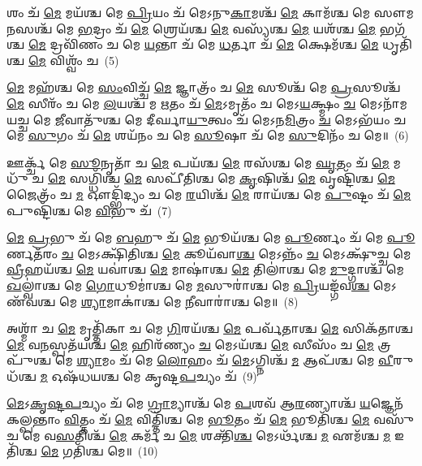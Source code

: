 {\anuvakamend[{𑌜\-\ul{𑌗}\-𑌚𑍍𑌚\-\ul{𑌰𑍍𑌦𑍍𑌧𑌿}\-𑌶𑍍𑌚𑌤𑍁᳴𑌰𑍍𑌦𑌶 𑌚}]}%

𑌶𑌂 𑌚᳴ \ul{𑌮𑍇} 𑌮𑌯᳴𑌶𑍍𑌚 𑌮𑍇 \ul{𑌪𑍍𑌰𑌿}\-𑌯𑌂 𑌚᳴ 𑌮𑍇\-𑌽𑌨𑍁\-\ul{𑌕𑌾}\-𑌮𑌶𑍍𑌚᳴ \ul{𑌮𑍇} 𑌕𑌾𑌮᳴𑌶𑍍𑌚 𑌮𑍇 𑌸𑍗𑌮\-\ul{𑌨}\-𑌸𑌶𑍍𑌚᳴ 𑌮𑍇 \ul{𑌭}\-𑌦𑍍𑌰𑌂 𑌚᳴ \ul{𑌮𑍇} 𑌶𑍍𑌰𑍇𑌯᳴𑌶𑍍𑌚 \ul{𑌮𑍇} 𑌵𑌸𑍍𑌯᳴𑌶𑍍𑌚 \ul{𑌮𑍇} 𑌯𑌶᳴𑌶𑍍𑌚 \ul{𑌮𑍇} 𑌭𑌗᳴𑌶𑍍𑌚 \ul{𑌮𑍇} 𑌦𑍍𑌰𑌵𑌿᳴𑌣𑌂 𑌚 𑌮𑍇 \ul{𑌯}\-𑌨𑍍𑌤𑌾 𑌚᳴ 𑌮𑍇 \ul{𑌧}\-𑌰𑍍𑌤𑌾 𑌚᳴ \ul{𑌮𑍇} 𑌕𑍍𑌷𑍇𑌮᳴𑌶𑍍𑌚 \ul{𑌮𑍇} 𑌧𑍃𑌤𑌿᳴𑌶𑍍𑌚 \ul{𑌮𑍇} 𑌵𑌿𑌶𑍍𑌵𑌂᳴ 𑌚~(5)

\-\ul{𑌮𑍇} 𑌮𑌹᳴𑌶𑍍𑌚 𑌮𑍇 \ul{𑌸𑌂}\-𑌵𑌿𑌚𑍍𑌚᳴ \ul{𑌮𑍇} 𑌜𑍍𑌞𑌾𑌤𑍍𑌰𑌂᳴ 𑌚 \ul{𑌮𑍇} 𑌸𑍂𑌶𑍍𑌚᳴ 𑌮𑍇 \ul{𑌪𑍍𑌰}\-𑌸𑍂𑌶𑍍𑌚᳴ \ul{𑌮𑍇} 𑌸𑍀𑌰𑌂᳴ 𑌚 𑌮𑍇 \ul{𑌲}\-𑌯𑌶𑍍𑌚᳴ 𑌮 \ul{𑌋}\-𑌤𑌂 𑌚᳴ \ul{𑌮𑍇}\-\-𑌽𑌮𑍃𑌤𑌂᳴ 𑌚 𑌮𑍇\-𑌽\-\ul{𑌯}\-𑌕𑍍𑌷𑍍𑌮𑌂 \ul{𑌚} 𑌮𑍇\-𑌽𑌨𑌾᳴𑌮𑌯𑌚𑍍𑌚 𑌮𑍇 \ul{𑌜𑍀}\-𑌵𑌾𑌤𑍁᳴𑌶𑍍𑌚 𑌮𑍇 𑌦𑍀𑌰𑍍𑌘𑌾\-\ul{𑌯𑍁}\-𑌤𑍍𑌵𑌂 𑌚᳴ 𑌮𑍇\-𑌽𑌨\-\ul{𑌮𑌿}\-𑌤𑍍𑌰𑌂 \ul{𑌚} 𑌮𑍇\-𑌽𑌭᳴𑌯𑌂 𑌚 𑌮𑍇 \ul{𑌸𑍁}\-𑌗𑌂 𑌚᳴ \ul{𑌮𑍇} 𑌶𑌯᳴𑌨𑌂 𑌚 𑌮𑍇 \ul{𑌸𑍂}\-𑌷𑌾 𑌚᳴ 𑌮𑍇 \ul{𑌸𑍁}\-𑌦𑌿𑌨𑌂᳴ 𑌚 𑌮𑍇॥~(6)

{\anuvakamend[{𑌵𑌿𑌶𑍍𑌵𑌂᳴ \ul{𑌚} 𑌶𑌯᳴𑌨\-\ul{𑌮}\-𑌷𑍍𑌟𑍗 𑌚᳴}]}%

𑌊𑌰𑍍𑌕𑍍𑌚᳴ 𑌮𑍇 \ul{𑌸𑍂}\-𑌨𑍃𑌤𑌾᳴ 𑌚 \ul{𑌮𑍇} 𑌪𑌯᳴𑌶𑍍𑌚 \ul{𑌮𑍇} 𑌰𑌸᳴𑌶𑍍𑌚 𑌮𑍇 \ul{𑌘𑍃}\-𑌤𑌂 𑌚᳴ \ul{𑌮𑍇} 𑌮𑌧𑍁᳴ 𑌚 \ul{𑌮𑍇} 𑌸𑌗𑍍𑌧𑌿᳴𑌶𑍍𑌚 \ul{𑌮𑍇} 𑌸𑌪𑍀᳴𑌤𑌿𑌶𑍍𑌚 𑌮𑍇 \ul{𑌕𑍃}\-𑌷𑌿𑌶𑍍𑌚᳴ \ul{𑌮𑍇} 𑌵𑍃𑌷𑍍𑌟𑌿᳴𑌶𑍍𑌚 \ul{𑌮𑍇} 𑌜𑍈𑌤𑍍𑌰𑌂᳴ 𑌚 \ul{𑌮} 𑌔𑌦𑍍𑌭𑌿᳴𑌦𑍍𑌯𑌂 𑌚 𑌮𑍇 \ul{𑌰}\-𑌯𑌿𑌶𑍍𑌚᳴ \ul{𑌮𑍇} 𑌰𑌾𑌯᳴𑌶𑍍𑌚 𑌮𑍇 \ul{𑌪𑍁}\-𑌷𑍍𑌟𑌂 𑌚᳴ \ul{𑌮𑍇} 𑌪𑍁𑌷𑍍𑌟𑌿᳴𑌶𑍍𑌚 𑌮𑍇 \ul{𑌵𑌿}\-𑌭𑍁 𑌚᳴~(7)

\-\ul{𑌮𑍇} \ul{𑌪𑍍𑌰}\-𑌭𑍁 𑌚᳴ 𑌮𑍇 \ul{𑌬}\-𑌹𑍁 𑌚᳴ \ul{𑌮𑍇} 𑌭𑍂𑌯᳴𑌶𑍍𑌚 𑌮𑍇 \ul{𑌪𑍂}\-𑌰𑍍𑌣𑌂 𑌚᳴ 𑌮𑍇 \ul{𑌪𑍂}\-𑌰𑍍𑌣𑌤᳴𑌰𑌂 \ul{𑌚} 𑌮𑍇\-𑌽𑌕𑍍𑌷𑌿᳴𑌤𑌿𑌶𑍍𑌚 \ul{𑌮𑍇} 𑌕𑍂𑌯᳴𑌵𑌾\-\ul{𑌶𑍍𑌚} 𑌮𑍇\-𑌽𑌨𑍍𑌨𑌂᳴ \ul{𑌚} 𑌮𑍇\-𑌽𑌕𑍍𑌷𑍁᳴𑌚𑍍𑌚 𑌮𑍇 \ul{𑌵𑍍𑌰𑍀}\-𑌹𑌯᳴𑌶𑍍𑌚 \ul{𑌮𑍇} 𑌯𑌵𑌾॑𑌶𑍍𑌚 \ul{𑌮𑍇} 𑌮𑌾𑌷𑌾॑𑌶𑍍𑌚 \ul{𑌮𑍇} 𑌤𑌿𑌲𑌾॑𑌶𑍍𑌚 𑌮𑍇 \ul{𑌮𑍁}\-𑌦𑍍𑌗𑌾𑌶𑍍𑌚᳴ 𑌮𑍇 \ul{𑌖}\-𑌲𑍍𑌵𑌾॑𑌶𑍍𑌚 𑌮𑍇 \ul{𑌗𑍋}\-𑌧𑍂𑌮𑌾॑𑌶𑍍𑌚 𑌮𑍇 \ul{𑌮}\-𑌸𑍁𑌰𑌾॑𑌶𑍍𑌚 𑌮𑍇 \ul{𑌪𑍍𑌰𑌿}\-𑌯𑌙𑍍𑌗᳴𑌵\-\ul{𑌶𑍍𑌚} 𑌮𑍇\-𑌽𑌣᳴𑌵𑌶𑍍𑌚 𑌮𑍇 \ul{𑌶𑍍𑌯𑌾}\-𑌮𑌾𑌕𑌾॑𑌶𑍍𑌚 𑌮𑍇 \ul{𑌨𑍀}\-𑌵𑌾𑌰𑌾॑𑌶𑍍𑌚 𑌮𑍇॥~(8)

{\anuvakamend[{\-\ul{𑌵𑌿}\-𑌭𑍁 𑌚᳴ \ul{𑌮}\-𑌸𑍁\-\ul{𑌰𑌾}\-𑌶𑍍𑌚𑌤𑍁᳴𑌰𑍍𑌦𑌶 𑌚}]}%

𑌅𑌶𑍍𑌮𑌾᳴ 𑌚 \ul{𑌮𑍇} 𑌮𑍃𑌤𑍍𑌤𑌿᳴𑌕𑌾 𑌚 𑌮𑍇 \ul{𑌗𑌿}\-𑌰𑌯᳴𑌶𑍍𑌚 \ul{𑌮𑍇} 𑌪𑌰𑍍𑌵᳴𑌤𑌾𑌶𑍍𑌚 \ul{𑌮𑍇} 𑌸𑌿𑌕᳴𑌤𑌾𑌶𑍍𑌚 \ul{𑌮𑍇} 𑌵\-\ul{𑌨}\-𑌸𑍍𑌪𑌤᳴𑌯𑌶𑍍𑌚 \ul{𑌮𑍇} 𑌹𑌿𑌰᳴𑌣𑍍𑌯𑌂 \ul{𑌚} 𑌮𑍇\-𑌽𑌯᳴𑌶𑍍𑌚 \ul{𑌮𑍇} 𑌸𑍀𑌸𑌂᳴ 𑌚 \ul{𑌮𑍇} 𑌤𑍍𑌰𑌪𑍁᳴𑌶𑍍𑌚 𑌮𑍇 \ul{𑌶𑍍𑌯𑌾}\-𑌮𑌂 𑌚᳴ 𑌮𑍇 \ul{𑌲𑍋}\-𑌹𑌂 𑌚᳴ \ul{𑌮𑍇}\-\-𑌽𑌗𑍍𑌨𑌿𑌶𑍍𑌚᳴ \ul{𑌮} 𑌆𑌪᳴𑌶𑍍𑌚 𑌮𑍇 \ul{𑌵𑍀}\-𑌰𑍁𑌧᳴𑌶𑍍𑌚 \ul{𑌮} 𑌓𑌷᳴𑌧𑌯𑌶𑍍𑌚 𑌮𑍇 𑌕𑍃𑌷𑍍𑌟\-\ul{𑌪}\-𑌚𑍍𑌯𑌂 𑌚᳴~(9)

\-\ul{𑌮𑍇}\-\-𑌽\-\ul{𑌕𑍃}\-\-\ul{𑌷𑍍𑌟}\-\-\ul{𑌪}\-𑌚𑍍𑌯𑌂 𑌚᳴ 𑌮𑍇 \ul{𑌗𑍍𑌰𑌾}\-𑌮𑍍𑌯𑌾𑌶𑍍𑌚᳴ 𑌮𑍇 \ul{𑌪}\-𑌶𑌵᳴ 𑌆\-\ul{𑌰}\-𑌣𑍍𑌯𑌾𑌶𑍍𑌚᳴ \ul{𑌯}\-𑌜𑍍𑌞𑍇𑌨᳴ 𑌕𑌲𑍍𑌪𑌨𑍍𑌤𑌾𑌂 \ul{𑌵𑌿}\-𑌤𑍍𑌤𑌂 𑌚᳴ \ul{𑌮𑍇} 𑌵𑌿𑌤𑍍𑌤𑌿᳴𑌶𑍍𑌚 𑌮𑍇 \ul{𑌭𑍂}\-𑌤𑌂 𑌚᳴ \ul{𑌮𑍇} 𑌭𑍂𑌤𑌿᳴𑌶𑍍𑌚 \ul{𑌮𑍇} 𑌵𑌸𑍁᳴ 𑌚 𑌮𑍇 𑌵\-\ul{𑌸}\-𑌤𑌿𑌶𑍍𑌚᳴ \ul{𑌮𑍇} 𑌕𑌰𑍍𑌮᳴ 𑌚 \ul{𑌮𑍇} 𑌶𑌕𑍍𑌤𑌿᳴\-\ul{𑌶𑍍𑌚} 𑌮𑍇\-𑌽𑌰𑍍𑌥᳴𑌶𑍍𑌚 \ul{𑌮} 𑌏𑌮᳴𑌶𑍍𑌚 \ul{𑌮} 𑌇𑌤𑌿᳴𑌶𑍍𑌚 \ul{𑌮𑍇} 𑌗𑌤𑌿᳴𑌶𑍍𑌚 𑌮𑍇॥~(10)

